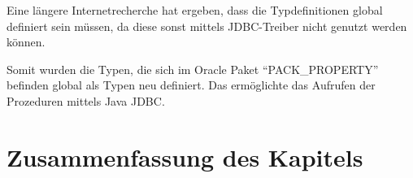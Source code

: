 Eine längere Internetrecherche hat ergeben, dass die Typdefinitionen global definiert sein müssen, da diese sonst mittels JDBC-Treiber nicht genutzt werden können.

Somit wurden die Typen, die sich im Oracle Paket \enquote{PACK\_PROPERTY} befinden global als Typen neu definiert. Das ermöglichte das Aufrufen der Prozeduren mittels Java JDBC. 


\section{Zusammenfassung des Kapitels}





